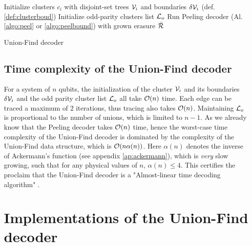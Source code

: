 \begin{algorithm}[htb]
  \BlankLine
  \BlankLine
  Initialize clusters $c_i$ with disjoint-set trees $\mathcal{V}_i$ and boundaries $\delta \mathcal{V}_i$ (def. \ref{def:clusterboud})\;
  Initialize odd-parity clusters list $\mathcal{L}_o$\;
  \BlankLine
  Run Peeling decoder (Al. \ref{algo:peel} or \ref{algo:peelbound}) with grown erasure $\bar{\mathcal{R}}$
  \BlankLine
  \caption{Union-Find decoder \cite{delfosse2017almost}}\label{algo:uf}
\end{algorithm}

\subsection{Time complexity of the Union-Find decoder}

For a system of $n$ qubits, the initialization of the cluster $\mathcal{V}_i$ and its boundaries $\delta \mathcal{V}_i$ and the odd parity cluster list $\mathcal{L}_o$ all take $\mathcal{O}(n)$ time. Each edge can be traced a maximum of 2 iterations, thus tracing also takes $\mathcal{O}(n)$. Maintaining $\mathcal{L}_o$ is proportional to the number of unions, which is limited to $n-1$. As we already know that the Peeling decoder takes $\mathcal{O}(n)$ time, hence the worst-case time complexity of the Union-Find decoder is dominated by the complexity of the Union-Find data structure, which is $\mathcal{O}(n\alpha(n))$. Here $\alpha(n)$ denotes the inverse of Ackermann's function (see appendix \ref{ap:ackermann}), which is \emph{very} slow growing, such that for any physical values of $n$, $\alpha(n) \leq 4$. This certifies the proclaim that the Union-Find decoder is a "Almost-linear time decoding algorithm" \cite{delfosse2017almost}. 

\section{Implementations of the Union-Find decoder}\label{sec:ufimplementations}

